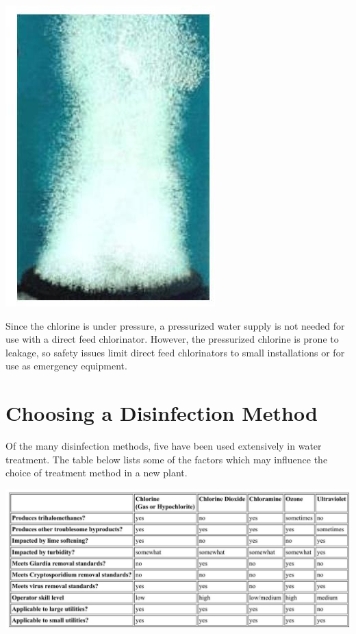 \documentclass[10pt]{article}
\begin{document}
\includegraphics[max width=\textwidth]{2022_10_14_eba0aec33b37be0fbdf2g-15}

Since the chlorine is under pressure, a pressurized water supply is not needed for use with a direct feed chlorinator. However, the pressurized chlorine is prone to leakage, so safety issues limit direct feed chlorinators to small installations or for use as emergency equipment.

\section{Choosing a Disinfection Method}
Of the many disinfection methods, five have been used extensively in water treatment. The table below lists some of the factors which may influence the choice of treatment method in a new plant.

\includegraphics[max width=\textwidth]{2022_10_14_eba0aec33b37be0fbdf2g-15(1)}
\end{document}
